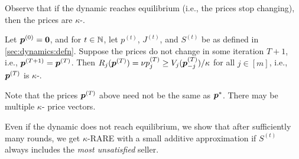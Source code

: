 Observe that if the dynamic reaches equilibrium (i.e., the prices stop changing),
then the prices are $\kappa$-\limRARE{}.

\begin{observation}
Let $\bm{p}^{(0)} = \mathbf{0}$, and for $t \in \mathbb{N}$, let $p^{(t)}$, $J^{(t)}$, and $S^{(t)}$
be as defined in \cref{sec:dynamics:defn}.
Suppose the prices do not change in some iteration $T+1$, i.e., $\bm{p}^{(T+1)} = \bm{p}^{(T)}$.
Then $R_j(\bm{p}^{(T)}) = \nu p^{(T)}_j \ge V_j(\bm{p}^{(T)}_{-j})/\kappa$ for all $j \in [m]$,
i.e., $\bm{p}^{(T)}$ is $\kappa$-\limRARE{}.
\end{observation}

Note that the prices $\bm{p}^{(T)}$ above need not be the same as $\bm{p}^*$.
There may be multiple $\kappa$-\limRARE{} price vectors.

Even if the dynamic does not reach equilibrium, we show that after sufficiently many rounds,
we get $\kappa$-RARE with a small additive approximation
if $S^{(t)}$ always includes the \emph{most unsatisfied} seller.

